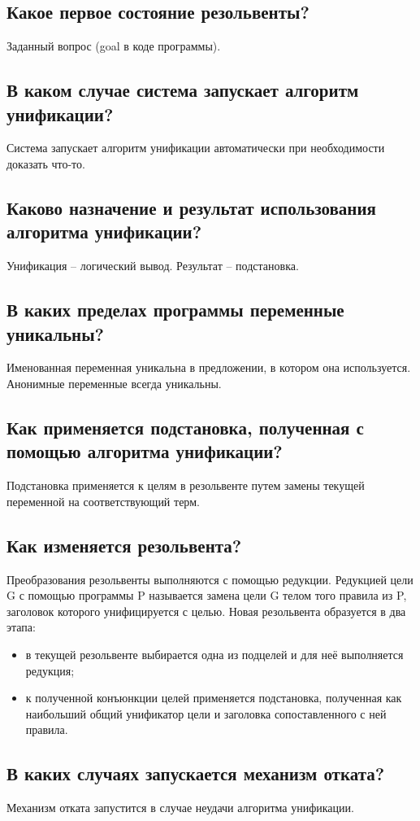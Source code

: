 \subsection*{Какое первое состояние резольвенты?}

Заданный вопрос (goal в коде программы).

\subsection*{В каком случае система запускает алгоритм унификации?}

Система запускает алгоритм унификации автоматически при необходимости доказать что-то.

\subsection*{Каково назначение и результат использования алгоритма унификации?}

Унификация – логический вывод. Результат – подстановка.

\subsection*{В каких пределах программы переменные уникальны?}

Именованная переменная уникальна в предложении, в котором она используется. Анонимные переменные всегда уникальны.

\subsection*{Как применяется подстановка, полученная с помощью алгоритма унификации?}

Подстановка применяется к целям в резольвенте путем замены текущей переменной на соответствующий терм.

\subsection*{Как изменяется резольвента?}

Преобразования резольвенты выполняются с помощью редукции. Редукцией цели G с помощью программы P называется замена цели G телом того правила из P, заголовок которого унифицируется с целью. Новая резольвента образуется в два этапа:
\begin{itemize}
    \item в текущей резольвенте выбирается одна из подцелей и для неё выполняется редукция;
    \item к полученной конъюнкции целей применяется подстановка, полученная как наибольший общий унификатор цели и заголовка сопоставленного с ней правила.
\end{itemize}

\subsection*{В каких случаях запускается механизм отката?}

Механизм отката запустится в случае неудачи алгоритма унификации.